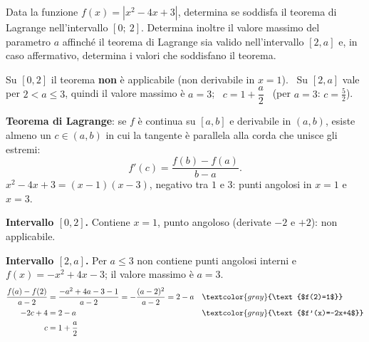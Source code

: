 \begin{question}[ID=2.5, subtitle={Lagrange per $|x^2-4x+3|$ su $[0,2]$ e $[2,a]$}, tags={lagrange, teoremi, valore assoluto}, difficulty=difficile]
Data la funzione $f(x) = |x^2 - 4x + 3|$, determina se soddisfa il teorema di Lagrange nell'intervallo \([0;\ 2]\). Determina inoltre il valore massimo del parametro $a$ affinché il teorema di Lagrange sia valido nell'intervallo $[2, a]$ e, in caso affermativo, determina i valori che soddisfano il teorema.
\begin{solution}
Su $[0,2]$ il teorema \textbf{non} è applicabile (non derivabile in $x=1$). \ Su $[2,a]$ vale per $2<a\leq3$, quindi il valore massimo è $a=3$; \ $c=1+\dfrac a2$ \ (per $a=3$: $c=\tfrac52$).
\end{solution}
\begin{explanation}
\textbf{Teorema di Lagrange}: se $f$ è continua su $[a,b]$ e derivabile in $(a,b)$, esiste almeno un $c\in(a,b)$ in cui la tangente è parallela alla corda che unisce gli estremi:
\[ f'(c)=\dfrac{f(b)-f(a)}{b-a}. \]
$x^2-4x+3=(x-1)(x-3)$, negativo tra $1$ e $3$: punti angolosi in $x=1$ e $x=3$.

\textbf{Intervallo $[0,2]$.} Contiene $x=1$, punto angoloso (derivate $-2$ e $+2$): non applicabile.

\textbf{Intervallo $[2,a]$.} Per $a\leq3$ non contiene punti angolosi interni e $f(x)=-x^2+4x-3$; il valore massimo è $a=3$.
\[\begin{aligned}
\dfrac{f(a)-f(2)}{a-2} &= \dfrac{-a^2+4a-3-1}{a-2}=-\dfrac{(a-2)^2}{a-2}=2-a && \textcolor{gray}{\text{$f(2)=1$}}\\
-2c+4 &= 2-a && \textcolor{gray}{\text{$f'(x)=-2x+4$}}\\
c &= 1+\dfrac a2
\end{aligned}\]
\end{explanation}
\end{question}
